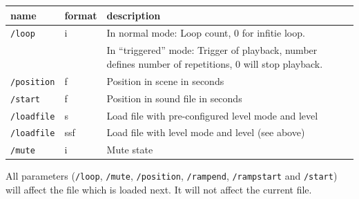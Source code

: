 \begin{tabularx}{\textwidth}{llX}
\hline
name            & format & description                                                                                             \\
\hline
{\tt /loop}     & i      & In normal mode: Loop count, 0 for infitie loop.                                                         \\
                &        & In ``triggered'' mode: Trigger of playback, number defines number of repetitions, 0 will stop playback. \\
{\tt /position} & f      & Position in scene in seconds                                                                            \\
{\tt /start}    & f      & Position in sound file in seconds                                                                       \\
{\tt /loadfile} & s      & Load file with pre-configured level mode and level                                                      \\
{\tt /loadfile} & ssf    & Load file with level mode and level (see above)                                                         \\
{\tt /mute}     & i      & Mute state                                                                                              \\
\hline
\end{tabularx}



All parameters (\verb!/loop!, \verb!/mute!, \verb!/position!,
\verb!/rampend!, \verb!/rampstart! and \verb!/start!) will affect the
file which is loaded next. It will not affect the current file.
